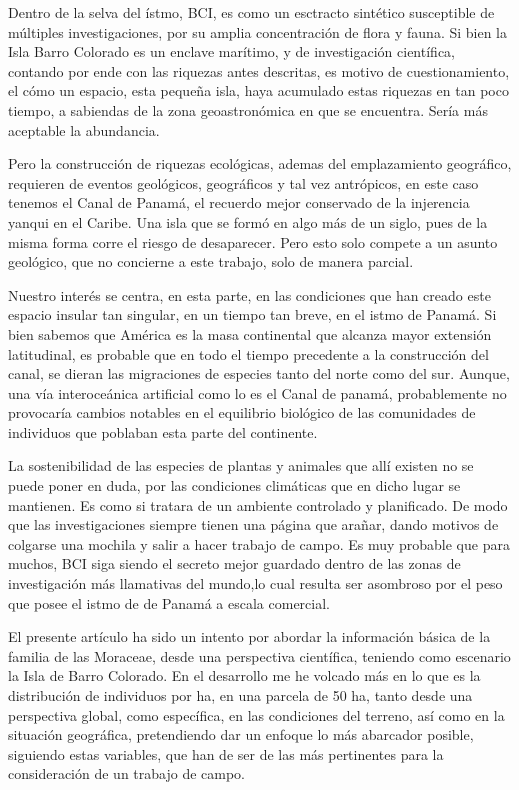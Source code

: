 \documentclass[11pt,]{article}
\begin{document}
Dentro de la selva del ístmo, BCI, es como un esctracto sintético
susceptible de múltiples investigaciones, por su amplia concentración de
flora y fauna. Si bien la Isla Barro Colorado es un enclave marítimo, y
de investigación científica, contando por ende con las riquezas antes
descritas, es motivo de cuestionamiento, el cómo un espacio, esta
pequeña isla, haya acumulado estas riquezas en tan poco tiempo, a
sabiendas de la zona geoastronómica en que se encuentra. Sería más
aceptable la abundancia.

Pero la construcción de riquezas ecológicas, ademas del emplazamiento
geográfico, requieren de eventos geológicos, geográficos y tal vez
antrópicos, en este caso tenemos el Canal de Panamá, el recuerdo mejor
conservado de la injerencia yanqui en el Caribe. Una isla que se formó
en algo más de un siglo, pues de la misma forma corre el riesgo de
desaparecer. Pero esto solo compete a un asunto geológico, que no
concierne a este trabajo, solo de manera parcial.

Nuestro interés se centra, en esta parte, en las condiciones que han
creado este espacio insular tan singular, en un tiempo tan breve, en el
istmo de Panamá. Si bien sabemos que América es la masa continental que
alcanza mayor extensión latitudinal, es probable que en todo el tiempo
precedente a la construcción del canal, se dieran las migraciones de
especies tanto del norte como del sur. Aunque, una vía interoceánica
artificial como lo es el Canal de panamá, probablemente no provocaría
cambios notables en el equilibrio biológico de las comunidades de
individuos que poblaban esta parte del continente.

La sostenibilidad de las especies de plantas y animales que allí existen
no se puede poner en duda, por las condiciones climáticas que en dicho
lugar se mantienen. Es como si tratara de un ambiente controlado y
planificado. De modo que las investigaciones siempre tienen una página
que arañar, dando motivos de colgarse una mochila y salir a hacer
trabajo de campo. Es muy probable que para muchos, BCI siga siendo el
secreto mejor guardado dentro de las zonas de investigación más
llamativas del mundo,lo cual resulta ser asombroso por el peso que posee
el istmo de de Panamá a escala comercial.

El presente artículo ha sido un intento por abordar la información
básica de la familia de las Moraceae, desde una perspectiva científica,
teniendo como escenario la Isla de Barro Colorado. En el desarrollo me
he volcado más en lo que es la distribución de individuos por ha, en una
parcela de 50 ha, tanto desde una perspectiva global, como específica,
en las condiciones del terreno, así como en la situación geográfica,
pretendiendo dar un enfoque lo más abarcador posible, siguiendo estas
variables, que han de ser de las más pertinentes para la consideración
de un trabajo de campo.
\end{document}
